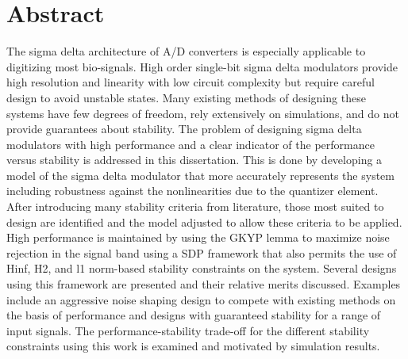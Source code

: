 
\chapter{Abstract}

The sigma delta architecture of \gls{A/D} converters is especially applicable to digitizing most bio-signals. High order single-bit sigma delta modulators provide high resolution and linearity with low circuit complexity but require careful design to avoid unstable states. Many existing methods of designing these systems have few degrees of freedom, rely extensively on simulations, and do not provide guarantees about stability. The problem of designing sigma delta modulators with high performance and a clear indicator of the performance versus stability is addressed in this dissertation. This is done by developing a model of the sigma delta modulator that more accurately represents the system including robustness against the nonlinearities due to the quantizer element. After introducing many stability criteria from literature, those most suited to design are identified and the model adjusted to allow these criteria to be applied. High performance is maintained by using the \gls{GKYP} lemma to maximize noise rejection in the signal band using a \gls{SDP} framework that also permits the use of \gls{Hinf}, \gls{H2}, and \gls{l1} norm-based stability constraints on the system. Several designs using this framework are presented and their relative merits discussed. Examples include an aggressive noise shaping design to compete with existing methods on the basis of performance and designs with guaranteed stability for a range of input signals. The performance-stability trade-off for the different stability constraints using this work is examined and motivated by simulation results.

\vfill
\begin{center}
\begin{sf}
\end{sf}
\end{center}
